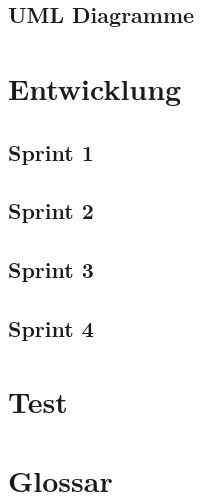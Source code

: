 \documentclass[a4paper,parskip]{scrartcl}
\begin{document}
\subsection{UML Diagramme}

\section{Entwicklung}
\subsection{Sprint 1}
\subsection{Sprint 2}
\subsection{Sprint 3}
\subsection{Sprint 4}

\section{Test}

\section{Glossar}
\end{document}
